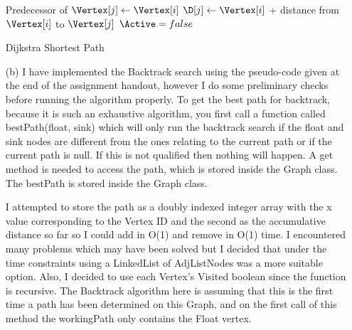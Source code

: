 \documentclass{article}
\begin{document}
\begin{itemize}
\begin{algorithm}[H]
{{{{            Predecessor of $\Vertex[j] \leftarrow \Vertex[i]$\;
            $\D[j] \leftarrow \Vertex[i]$ + distance from $\Vertex[i]$ to $\Vertex[j]$\;
          }
        }
        $\Active = false$\;
      }
    }
    \caption{Dijkstra Shortest Path}
    \label{alg:dijkstra}
  \end{algorithm}


\item[(b)]
I have implemented the Backtrack search using the pseudo-code given at the end of the assignment handout, however I do some preliminary checks before running the algorithm properly. To get the best path for backtrack, because it is such an exhaustive algorithm, you first call a function called bestPath(float, sink) which will only run the backtrack search if the float and sink nodes are different from the ones relating to the current path or if the current path is null. If this is not qualified then nothing will happen. A get method is needed to access the path, which is stored inside the Graph class. The bestPath is stored inside the Graph class.

I attempted to store the path as a doubly indexed integer array with the x value corresponding to the Vertex ID and the second as the accumulative distance so far so I could add in O(1) and remove in O(1) time. I encountered many problems which may have been solved but I decided that under the time constraints using a LinkedList of AdjListNodes was a more suitable option. Also, I decided to use each Vertex's Visited boolean since the function is recursive. The Backtrack algorithm here is assuming that this is the first time a path has been determined on this Graph, and on the first call of this method the workingPath only contains the Float vertex. 


\end{itemize}
\end{document}
